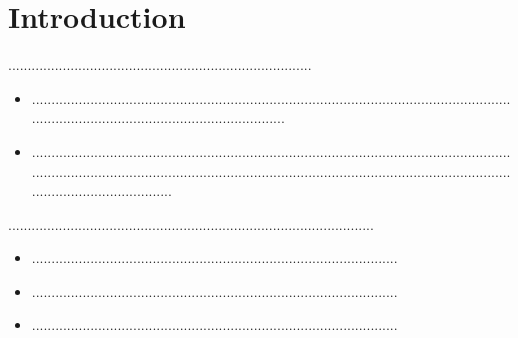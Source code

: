 
\section{Introduction}
..............................................................................
\begin{itemize}
	\item ............................................................................................................................................................................................
	\item ..........................................................................................................................................................................................................................................................................................
\end{itemize}
..............................................................................................
\begin{itemize}
    \item ..............................................................................................
    \item ..............................................................................................
    \item ..............................................................................................
\end{itemize}
\newpage


